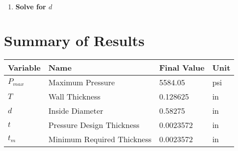 \documentclass[11pt,a4paper]{article}
\begin{document}
\begin{enumerate}[label=\textbf{Step \arabic*:},leftmargin=2cm]
\item \textbf{Solve for $d$}


\end{enumerate}


\section{Summary of Results}

\begin{longtable}{llll}
\toprule
Variable & Name & Final Value & Unit \\
\midrule
\endhead
$P_{max}$ & Maximum Pressure & 5584.05 & psi \\
$T$ & Wall Thickness & 0.128625 & in \\
$d$ & Inside Diameter & 0.58275 & in \\
$t$ & Pressure Design Thickness & 0.0023572 & in \\
$t_{m}$ & Minimum Required Thickness & 0.0023572 & in \\
\bottomrule
\end{longtable}
\end{document}
